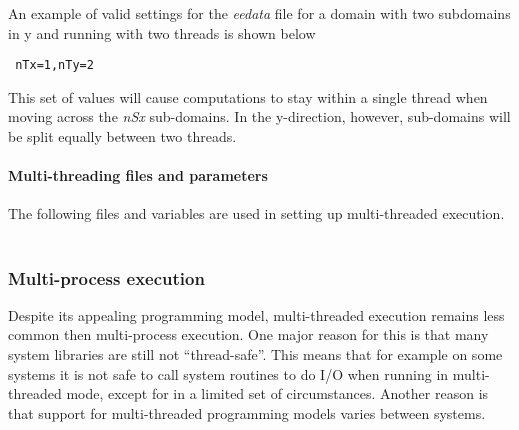 An example of valid settings for the {\em eedata} file for a
domain with two subdomains in y and running with two threads is shown 
below
\begin{verbatim}
 nTx=1,nTy=2
\end{verbatim}
This set of values will cause computations to stay within a single
thread when moving across the {\em nSx} sub-domains. In the y-direction,
however, sub-domains will be split equally between two threads.

\paragraph{Multi-threading files and parameters} The following
files and variables are used in setting up multi-threaded execution.\\

 \\

\subsubsection{Multi-process execution}
\label{sect:multi-process-execution}

Despite its appealing programming model, multi-threaded execution remains
less common then multi-process execution. One major reason for this
is that many system libraries are still not ``thread-safe''. This means that for
example on some systems it is not safe to call system routines to
do I/O when running in multi-threaded mode, except for in a limited set of 
circumstances. Another reason is that support for multi-threaded programming
models varies between systems. 

